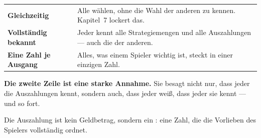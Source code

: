 \begin{merksatz}
\begin{center}
{\small
\renewcommand{\arraystretch}{1.52}
\begin{tabular}{@{}P{2.4cm}P{6.2cm}@{}}
\toprule
\textbf{Gleichzeitig} & Alle wählen, ohne die Wahl der anderen zu kennen. Kapitel~7 lockert das.\\
\textbf{Vollständig bekannt} & Jeder kennt alle Strategiemengen und alle Auszahlungen --- auch die der anderen.\\
\textbf{Eine Zahl je Ausgang} & Alles, was einem Spieler wichtig ist, steckt in einer einzigen Zahl.\\
\bottomrule
\end{tabular}}
\end{center}

\begin{center}
\begin{minipage}{0.9\textwidth}
\textbf{Die zweite Zeile ist eine starke Annahme.} Sie besagt nicht nur, dass jeder die Auszahlungen kennt, sondern auch, dass jeder weiß, dass jeder sie kennt --- und so fort.
\end{minipage}
\end{center}

\begin{center}
\begin{minipage}{0.88\textwidth}
\end{minipage}
\end{center}

Die Auszahlung ist kein Geldbetrag, sondern ein : eine Zahl, die die Vorlieben des Spielers vollständig ordnet.

\begin{center}
\begin{minipage}{0.88\textwidth}
\end{minipage}
\end{center}
\end{merksatz}

